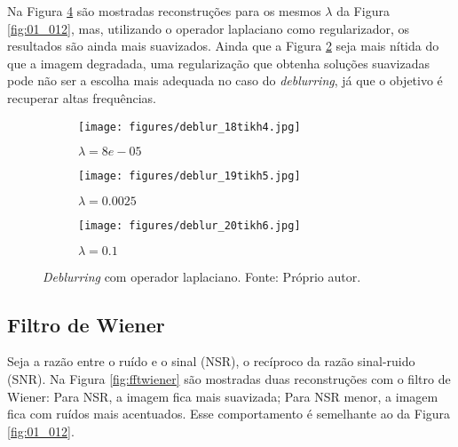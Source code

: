Na Figura \ref{fig:laplacian} são mostradas reconstruções para os mesmos $\lambda$ da Figura \ref{fig:01_012}, mas, utilizando o operador laplaciano como regularizador, os resultados são ainda mais suavizados. Ainda que a Figura \ref{fig:laplacianb} seja mais nítida do que a imagem degradada, uma regularização que obtenha soluções suavizadas pode não ser a escolha mais adequada no caso do \textit{deblurring}, já que o objetivo é recuperar altas frequências.



\begin{figure}[H]
     \centering
     \begin{subfigure}[b]{0.32\textwidth}
         \centering
         \texttt{[image: figures/deblur\_18tikh4.jpg]}
         \caption{$\lambda = 8e-05$}
         \label{fig:laplaciana}
     \end{subfigure}
     \hfill
     \begin{subfigure}[b]{0.32\textwidth}
         \centering
                  \texttt{[image: figures/deblur\_19tikh5.jpg]}
         \caption{$\lambda = 0.0025$}
         \label{fig:laplacianb}
     \end{subfigure}
          \hfill
     \begin{subfigure}[b]{0.32\textwidth}
         \centering
                  \texttt{[image: figures/deblur\_20tikh6.jpg]}
         \caption{$\lambda = 0.1$}
         \label{fig:laplacianc}
     \end{subfigure}
\caption[\textit{Deblurring} com operador laplaciano.]{\textit{Deblurring} com operador laplaciano. Fonte: Próprio autor.}
\label{fig:laplacian}
\end{figure}




\subsection{Filtro de Wiener}

Seja a razão entre o ruído e o sinal (NSR), o  recíproco da razão sinal-ruido (SNR). Na Figura \ref{fig:fftwiener} são mostradas duas reconstruções com o filtro de Wiener: Para NSR, a imagem fica mais suavizada; Para NSR menor, a imagem fica com ruídos mais acentuados. Esse comportamento é semelhante ao da Figura \eqref{fig:01_012}.

